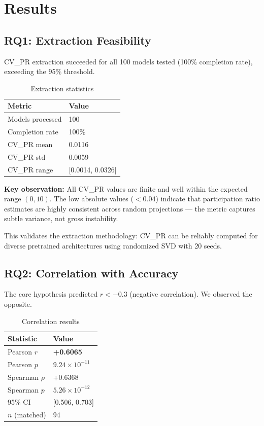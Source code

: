 \section{Results}
\label{sec:results}

\subsection{RQ1: Extraction Feasibility}

CV\_PR extraction succeeded for all 100 models tested (100\% completion rate), exceeding the 95\% threshold.

\begin{table}[h]
\centering
\caption{Extraction statistics}
\label{tab:extraction}
\begin{tabular}{@{}ll@{}}
\toprule
Metric & Value \\
\midrule
Models processed & 100 \\
Completion rate & 100\% \\
CV\_PR mean & 0.0116 \\
CV\_PR std & 0.0059 \\
CV\_PR range & [0.0014, 0.0326] \\
\bottomrule
\end{tabular}
\end{table}

\textbf{Key observation:} All CV\_PR values are finite and well within the expected range $(0, 10)$. The low absolute values ($< 0.04$) indicate that participation ratio estimates are highly consistent across random projections --- the metric captures subtle variance, not gross instability.

This validates the extraction methodology: CV\_PR can be reliably computed for diverse pretrained architectures using randomized SVD with 20 seeds.

\subsection{RQ2: Correlation with Accuracy}

The core hypothesis predicted $r < -0.3$ (negative correlation). We observed the opposite.

\begin{table}[h]
\centering
\caption{Correlation results}
\label{tab:correlation}
\begin{tabular}{@{}ll@{}}
\toprule
Statistic & Value \\
\midrule
Pearson $r$ & \textbf{+0.6065} \\
Pearson $p$ & $9.24 \times 10^{-11}$ \\
Spearman $\rho$ & +0.6368 \\
Spearman $p$ & $5.26 \times 10^{-12}$ \\
95\% CI & [0.506, 0.703] \\
$n$ (matched) & 94 \\
\bottomrule
\end{tabular}
\end{table}

